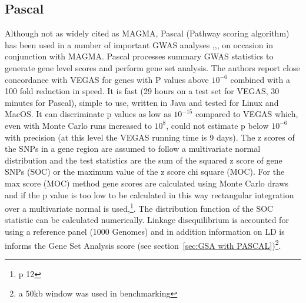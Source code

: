 


\subsection{Pascal}
\label{sec:PASCAL_gene_score}
 Although not as widely cited as MAGMA, Pascal\cite{lamparter2016fast} (Pathway scoring algorithm) has been used in a number of important GWAS analyses \cite{liu2019association},\cite{marouli2017rare},\cite{jones2019genome}, on occasion in conjunction with MAGMA\cite{dashti2019genome}.
Pascal processes summary GWAS statistics to generate gene level scores and perform gene set analysis. The authors report close concordance with VEGAS for genes with P values above $10^{-6}$ combined with a 100 fold reduction in speed. It is fast (29 hours on a test set for VEGAS, 30 minutes for Pascal), simple to use, written in Java and tested for Linux and MacOS. It can discriminate p values as low as $10^{-15}$ compared to VEGAS which, even with Monte Carlo runs increased to $10^8$, could not estimate p below $10^{-6}$ with precision (at this level the VEGAS running time is 9 days). The z scores of the SNPs in a gene region are assumed to follow a multivariate normal distribution and the test statistics are the sum of the squared z score of gene SNPs (SOC) or the maximum value of the z score chi square (MOC). For the max score (MOC) method gene scores are calculated using Monte Carlo draws and if the p value is too low to be calculated in this way rectangular integration over a multivariate normal is used\cite{genz1992numerical},\cite{lamparter2016fast}\footnote{p 12}. The distribution function of the SOC statistic can be calculated numerically\cite{davies1980distribution}. Linkage disequilibrium is accounted for using a reference panel (1000 Genomes) and in addition information on LD is informs the Gene Set Analysis score (see section~\ref{sec:GSA with PASCAL})\footnote{a 50kb window was used in benchmarking}.

